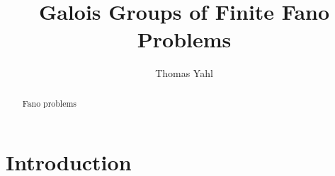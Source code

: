 \documentclass[12pt]{amsart}
\title{Galois Groups of Finite Fano Problems}
\author[T.~Yahl]{Thomas Yahl}
\theoremstyle{definition}
\begin{document}
\begin{abstract}
Fano problems
\end{abstract}

\maketitle


\section{Introduction}


\section{}


\section{}



%

\end{document}
